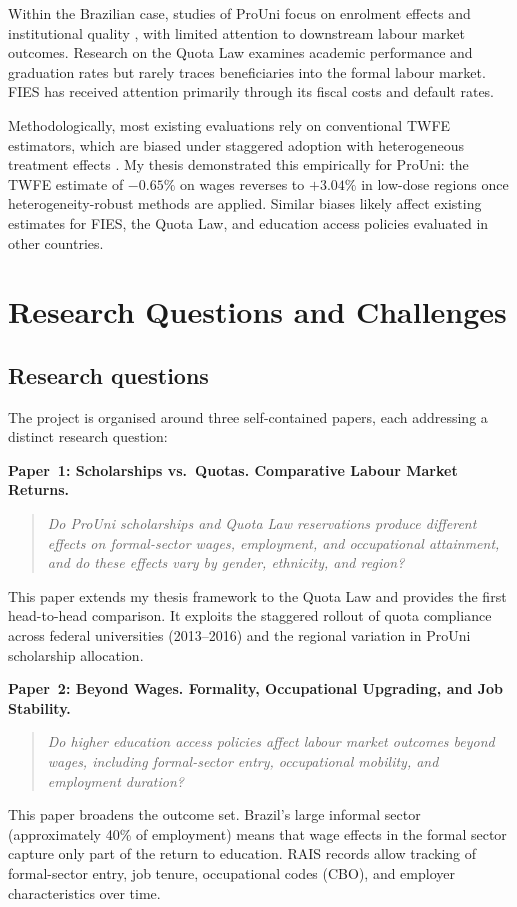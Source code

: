 \documentclass[a4paper,11pt]{article}
\begin{document}
Within the Brazilian case, studies of ProUni focus on enrolment effects \citep{cataldo2020} and institutional quality \citep{aprile2009}, with limited attention to downstream labour market outcomes. Research on the Quota Law examines academic performance and graduation rates but rarely traces beneficiaries into the formal labour market. FIES has received attention primarily through its fiscal costs and default rates.

Methodologically, most existing evaluations rely on conventional TWFE estimators, which are biased under staggered adoption with heterogeneous treatment effects \citep{goodmanbacon2021, dechaisemartin2020}. My thesis demonstrated this empirically for ProUni: the TWFE estimate of $-0.65\%$ on wages reverses to $+3.04\%$ in low-dose regions once heterogeneity-robust methods are applied. Similar biases likely affect existing estimates for FIES, the Quota Law, and education access policies evaluated in other countries.

\section{Research Questions and Challenges}

\subsection{Research questions}

The project is organised around three self-contained papers, each addressing a distinct research question:

\textbf{Paper~1: Scholarships vs.\ Quotas. Comparative Labour Market Returns.}
\begin{quote}
\textit{Do ProUni scholarships and Quota Law reservations produce different effects on formal-sector wages, employment, and occupational attainment, and do these effects vary by gender, ethnicity, and region?}
\end{quote}
This paper extends my thesis framework to the Quota Law and provides the first head-to-head comparison. It exploits the staggered rollout of quota compliance across federal universities (2013--2016) and the regional variation in ProUni scholarship allocation.

\textbf{Paper~2: Beyond Wages. Formality, Occupational Upgrading, and Job Stability.}
\begin{quote}
\textit{Do higher education access policies affect labour market outcomes beyond wages, including formal-sector entry, occupational mobility, and employment duration?}
\end{quote}
This paper broadens the outcome set. Brazil's large informal sector (approximately 40\% of employment) means that wage effects in the formal sector capture only part of the return to education. RAIS records allow tracking of formal-sector entry, job tenure, occupational codes (CBO), and employer characteristics over time.
\end{document}
